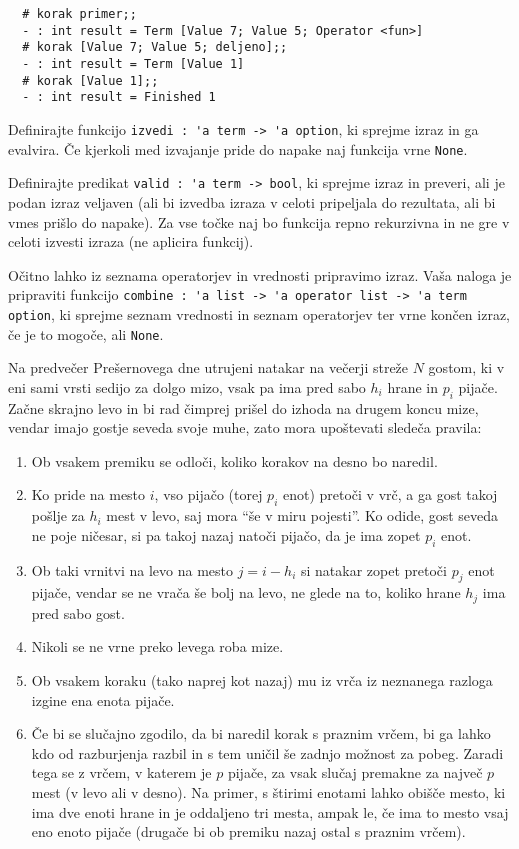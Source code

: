 \documentclass[arhiv]{../izpit}
\begin{document}
\begin{verbatim}
  # korak primer;;
  - : int result = Term [Value 7; Value 5; Operator <fun>]
  # korak [Value 7; Value 5; deljeno];;
  - : int result = Term [Value 1]
  # korak [Value 1];;
  - : int result = Finished 1
\end{verbatim}

\podnaloga
Definirajte funkcijo \verb|izvedi : 'a term -> 'a option|, ki sprejme izraz in ga evalvira. 
Če kjerkoli med izvajanje pride do napake naj funkcija vrne \verb|None|.

\podnaloga
Definirajte predikat \verb|valid : 'a term -> bool|, ki sprejme izraz in preveri, 
ali je podan izraz veljaven (ali bi izvedba izraza v celoti pripeljala do rezultata, 
ali bi vmes prišlo do napake). 
Za vse točke naj bo funkcija repno rekurzivna in ne gre v celoti izvesti izraza (ne aplicira funkcij).

\podnaloga
Očitno lahko iz seznama operatorjev in vrednosti pripravimo izraz. 
Vaša naloga je pripraviti funkcijo \verb|combine : 'a list -> 'a operator list -> 'a term option|, 
ki sprejme seznam vrednosti in seznam operatorjev ter vrne končen izraz, če je to mogoče, ali \verb|None|.


\naloga

Na predvečer Prešernovega dne utrujeni natakar na večerji streže $N$ gostom, ki v eni sami vrsti sedijo za dolgo mizo, vsak pa ima pred sabo $h_i$ hrane in $p_i$ pijače. Začne skrajno levo in bi rad čimprej prišel do izhoda na drugem koncu mize, vendar imajo gostje seveda svoje muhe, zato mora upoštevati sledeča pravila:

\begin{enumerate}
  \item Ob vsakem premiku se odloči, koliko korakov na desno bo naredil. 
  \item\label{i:obisk} Ko pride na mesto $i$, vso pijačo (torej $p_i$ enot) pretoči v vrč, a ga gost takoj pošlje za $h_i$ mest v levo, saj mora ``še v miru pojesti''. Ko odide, gost seveda ne poje ničesar, si pa takoj nazaj natoči pijačo, da je ima zopet $p_i$ enot.
  \item Ob taki vrnitvi na levo na mesto $j = i - h_i$ si natakar zopet pretoči $p_j$ enot pijače, vendar se ne vrača še bolj na levo, ne glede na to, koliko hrane $h_j$ ima pred sabo gost.
  \item Nikoli se ne vrne preko levega roba mize.
  \item Ob vsakem koraku (tako naprej kot nazaj) mu iz vrča iz neznanega razloga izgine ena enota pijače.
  \item Če bi se slučajno zgodilo, da bi naredil korak s praznim vrčem, bi ga lahko kdo od razburjenja razbil in s tem uničil še zadnjo možnost za pobeg. Zaradi tega se z vrčem, v katerem je $p$ pijače, za vsak slučaj premakne za največ $p$ mest (v levo ali v desno). Na primer, s štirimi enotami lahko obišče mesto, ki ima dve enoti hrane in je oddaljeno tri mesta, ampak le, če ima to mesto vsaj eno enoto pijače (drugače bi ob premiku nazaj ostal s praznim vrčem).
\end{enumerate}
\end{document}
